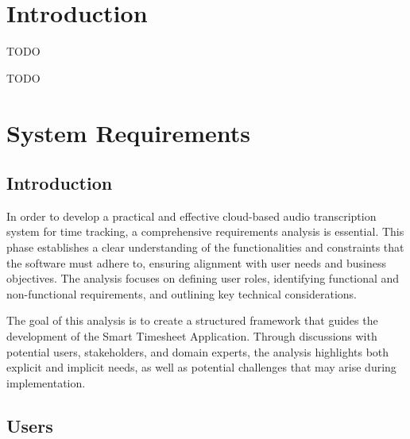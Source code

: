 \documentclass[
  digital,     %
  oneside,     %
  nosansbold,  %
  nocolorbold, %
  lof,         %
  lot,         %
]{fithesis4}
\begin{document}
\chapter*{Introduction}
TODO

\begin{otherlanguage}{czech}
TODO
\end{otherlanguage}

\chapter{System Requirements}

\section{Introduction}

In order to develop a practical and effective cloud-based audio transcription system for time tracking, a comprehensive requirements analysis is essential. This phase establishes a clear understanding of the functionalities and constraints that the software must adhere to, ensuring alignment with user needs and business objectives. The analysis focuses on defining user roles, identifying functional and non-functional requirements, and outlining key technical considerations.

The goal of this analysis is to create a structured framework that guides the development of the Smart Timesheet Application. Through discussions with potential users, stakeholders, and domain experts, the analysis highlights both explicit and implicit needs, as well as potential challenges that may arise during implementation.

\section{Users}
\end{document}
